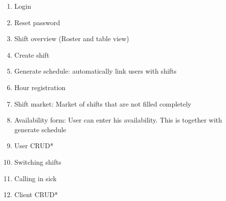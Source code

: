 \begin{enumerate}
    \item Login
    \item Reset password
    \item Shift overview (Roster and table view)
    \item Create shift
    \item Generate schedule: automatically link users with shifts
    \item Hour registration
    \item Shift market: Market of shifts that are not filled completely
    \item Availability form: User can enter his availability. This is together with generate schedule
    \item User CRUD*
    \item Switching shifts
    \item Calling in sick
    \item Client CRUD*
\end{enumerate}
